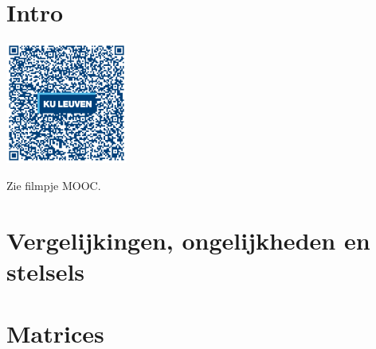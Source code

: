 
\section*{Intro}
\begin{minipage}{.25\linewidth}
	\raggedright
	\includegraphics[width=4cm]{5_vglen_ongelijkheden_stelsels_matrices/inputs/QR_Code_INTRO_module5new}
\end{minipage}
\begin{minipage}{.7\linewidth}
	Zie filmpje MOOC.
\end{minipage}

\section{Vergelijkingen, ongelijkheden en stelsels}



\section{Matrices}


